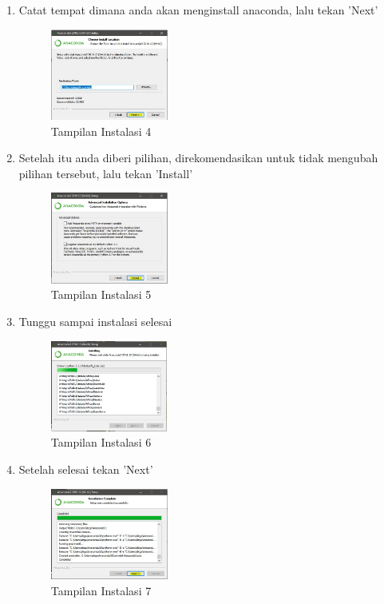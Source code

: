 \begin{enumerate}
  \item Catat tempat dimana anda akan menginstall anaconda, lalu tekan 'Next'
\begin{figure}[!htbp]
  \centering
  \includegraphics[height=3cm]{chapters/gambar/install4.jpg}
  \caption{Tampilan Instalasi 4}
\end{figure}

  \item Setelah itu anda diberi pilihan, direkomendasikan untuk tidak mengubah pilihan tersebut, lalu tekan 'Install'
\begin{figure}[!htbp]
  \centering
  \includegraphics[height=3cm]{chapters/gambar/install5.jpg}
  \caption{Tampilan Instalasi 5}
\end{figure}

  \item Tunggu sampai instalasi selesai
\begin{figure}[!htbp]
  \centering
  \includegraphics[height=3cm]{chapters/gambar/install6.jpg}
  \caption{Tampilan Instalasi 6}
\end{figure}

  \item Setelah selesai tekan 'Next'
\begin{figure}[!htbp]
  \centering
  \includegraphics[height=3cm]{chapters/gambar/install7.jpg}
  \caption{Tampilan Instalasi 7}
\end{figure}


\end{enumerate}
